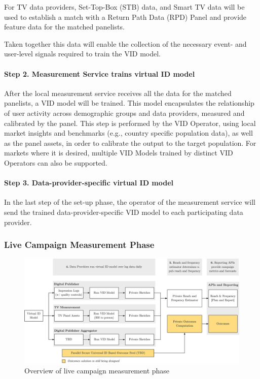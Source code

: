 \documentclass[]{article}
\let\oldparagraph\paragraph
\renewcommand{\paragraph}[1]{\oldparagraph{#1}\mbox{}}
\begin{document}
For TV data providers, Set-Top-Box (STB) data, and Smart TV data will be used to establish a match with a Return Path Data (RPD) Panel and provide feature data for the matched panelists.

Taken together this data will enable the collection of the necessary event- and user-level signals required to train the VID model.

\paragraph{Step 2. Measurement Service trains virtual ID model}
After the local measurement service receives all the data for the matched panelists, a VID model will be trained. This model encapsulates the relationship of user activity across demographic groups and data
providers, measured and calibrated by the panel. This step is performed by the VID Operator, using local market insights and benchmarks (e.g., country specific population data), as well as the panel assets, in order to calibrate the output to the target population. For markets where it is desired, multiple VID Models trained by distinct VID Operators can also be supported.


\paragraph{Step 3. Data-provider-specific virtual ID model}
In the last step of the set-up phase, the operator of the measurement service will send the trained data-provider-specific VID model to each participating data provider.



\vspace*{0.5cm}
\subsubsection{Live Campaign Measurement Phase}

\vspace*{0.2cm}
\begin{figure}
\caption{Overview of live campaign measurement phase}
\vspace*{0.5cm}
\vspace*{0.2cm}
\includegraphics[width=\textwidth]{image3.png}
\centering
\end{figure}
\vspace*{0.5cm}
\end{document}
